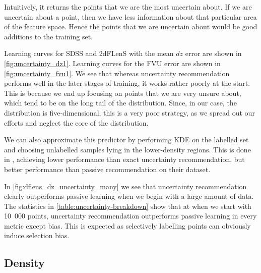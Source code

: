 \documentclass[11pt,twoside,openright]{report}
\begin{document}
Intuitively, it returns the points that we are the most uncertain about. If we are uncertain about a point, then we have less information about that particular area of the feature space. Hence the points that we are uncertain about would be good additions to the training set.

Learning curves for SDSS and 2dFLenS with the mean $dz$ error are shown in \cref{fig:uncertainty_dz1}. Learning curves for the FVU error are shown in \cref{fig:uncertainty_fvu1}. We see that whereas uncertainty recommendation performs well in the later stages of training, it works rather poorly at the start. This is because we end up focusing on points that we are very unsure about, which tend to be on the long tail of the distribution. Since, in our case, the distribution is five-dimensional, this is a very poor strategy, as we spread out our efforts and neglect the core of the distribution.

We can also approximate this predictor by performing KDE on the labelled set and choosing unlabelled samples lying in the lower-density regions. This is done in \citep{GPActiveLearning}, achieving lower performance than exact uncertainty recommendation, but better performance than passive recommendation on their dataset.

In \cref{fig:dflens_dz_uncertainty_many} we see that uncertainty recommendation clearly outperforms passive learning when we begin with a large amount of data. The statistics in \cref{table:uncertainty-breakdown} show that at when we start with 10~000 points, uncertainty recommendation outperforms passive learning in every metric except bias. This is expected as selectively labelling points can obviously induce selection bias.

\subsection{Density}
\end{document}
